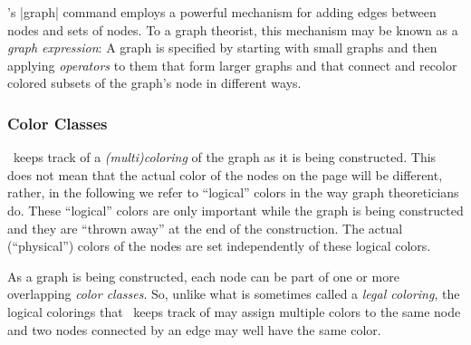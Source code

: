 \tikzname's |graph| command employs a powerful mechanism for adding edges
between nodes and sets of nodes. To a graph theorist, this mechanism may be
known as a \emph{graph expression}: A graph is specified by starting with small
graphs and then applying \emph{operators} to them that form larger graphs and
that connect and recolor colored subsets of the graph's node in different ways.


\subsubsection{Color Classes}
\label{section-library-graph-coloring}

\tikzname\ keeps track of a \emph{(multi)coloring} of the graph as it is being
constructed. This does not mean that the actual color of the nodes on the page
will be different, rather, in the following we refer to ``logical'' colors in
the way graph theoreticians do. These ``logical'' colors are only important
while the graph is being constructed and they are ``thrown away'' at the end of
the construction. The actual (``physical'') colors of the nodes are set
independently of these logical colors.

As a graph is being constructed, each node can be part of one or more
overlapping \emph{color classes}. So, unlike what is sometimes called a
\emph{legal coloring}, the logical colorings that \tikzname\ keeps track of may
assign multiple colors to the same node and two nodes connected by an edge may
well have the same color.

